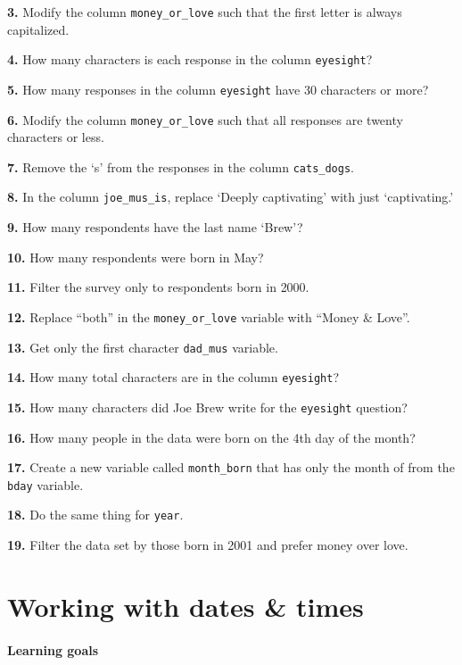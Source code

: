 \documentclass[]{book}
\begin{document}
\textbf{3.} Modify the column \texttt{money\_or\_love} such that the first letter is always capitalized.

\textbf{4.} How many characters is each response in the column \texttt{eyesight}?

\textbf{5.} How many responses in the column \texttt{eyesight} have 30 characters or more?

\textbf{6.} Modify the column \texttt{money\_or\_love} such that all responses are twenty characters or less.

\textbf{7.} Remove the `s' from the responses in the column \texttt{cats\_dogs}.

\textbf{8.} In the column \texttt{joe\_mus\_is}, replace `Deeply captivating' with just `captivating.'

\textbf{9.} How many respondents have the last name `Brew'?

\textbf{10.} How many respondents were born in May?

\textbf{11.} Filter the survey only to respondents born in 2000.

\textbf{12.} Replace ``both'' in the \texttt{money\_or\_love} variable with ``Money \& Love''.

\textbf{13.} Get only the first character \texttt{dad\_mus} variable.

\textbf{14.} How many total characters are in the column \texttt{eyesight}?

\textbf{15.} How many characters did Joe Brew write for the \texttt{eyesight} question?

\textbf{16.} How many people in the data were born on the 4th day of the month?

\textbf{17.} Create a new variable called \texttt{month\_born} that has only the month of from the \texttt{bday} variable.

\textbf{18.} Do the same thing for \texttt{year}.

\textbf{19.} Filter the data set by those born in 2001 and prefer money over love.

\hypertarget{dates}{%
\chapter{Working with dates \& times}\label{dates}}

\hypertarget{learning-goals-30}{%
\subsubsection*{Learning goals}\label{learning-goals-30}}
\end{document}
